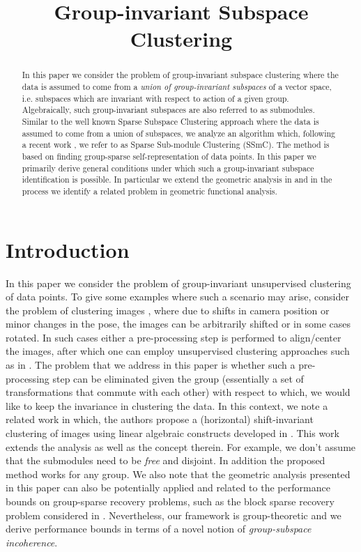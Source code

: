 \documentclass[conference]{IEEEtran}
\title{Group-invariant Subspace Clustering}
\author{\IEEEauthorblockN{Shuchin Aeron}
\IEEEauthorblockA{Dept. of Electrical and Computer Engineering\\
Tufts University, Medford, MA 02155\\
Email: shuchin@ece.tufts.edu}
\and
\IEEEauthorblockN{Eric Kernfeld}
\IEEEauthorblockA{Dept. of Statistics\\
University of Washington, Seattle, WA\\
Email: eric.kern13@gmail.com}}
\begin{document}
\maketitle

\begin{abstract}
In this paper we consider the problem of group-invariant subspace clustering where the data is assumed to come from a \emph{union of group-invariant subspaces} of a vector space, i.e. subspaces which are invariant with respect to action of a given group. Algebraically, such group-invariant subspaces are also referred to as submodules. Similar to the well known Sparse Subspace Clustering approach where the data is assumed to come from a union of subspaces, we analyze an algorithm which, following a recent work \cite{Kernfeld:2014wta}, we refer to as Sparse Sub-module Clustering (SSmC). The method is based on finding group-sparse self-representation of data points. In this paper we primarily derive general conditions under which such a group-invariant subspace identification is possible. In particular we extend the geometric analysis in \cite{Soltanolkotabi:2012ia} and in the process we identify a related problem in geometric functional analysis.
\end{abstract}


\section{Introduction}
In this paper we consider the problem of group-invariant unsupervised clustering of data points. To give some examples where such a scenario may arise, consider the problem of clustering images \cite{Basri:2003wd,Chen:2012eo,Hastie:1998wo}, where due to shifts in camera position or minor changes in the pose, the images can be arbitrarily shifted or in some cases rotated. In such cases either a pre-processing step is performed to align/center the images, after which one can employ unsupervised clustering approaches such as in \cite{Elhamifar:2012uz}. The problem that we address in this paper is whether such a pre-processing step can be eliminated given the group (essentially a set of transformations that commute with each other) with respect to which, we would like to keep the invariance in clustering the data. 
In this context, we note a related work \cite{Kernfeld:2014wta} in which, the authors propose a (horizontal) shift-invariant clustering of images using linear algebraic constructs developed in \cite{Kilmer:2013kx}. This work extends the analysis as well as the concept therein. For example, we don't assume that the submodules need to be \emph{free} and disjoint. In addition the proposed method works for any group. We also note that the geometric analysis presented in this paper can also be potentially applied and related to the performance bounds on group-sparse recovery problems, such as the block sparse recovery problem considered in \cite{Elhamifar:2012}. Nevertheless, our framework is group-theoretic and we derive performance bounds in terms of a novel notion of \emph{group-subspace incoherence}. 
\end{document}
